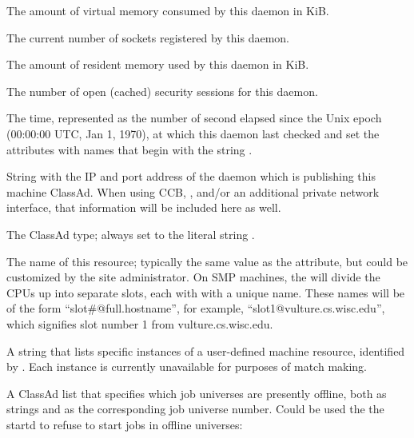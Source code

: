 \begin{description}
\item[\AdAttr{MonitorSelfImageSize}:] The amount of virtual memory consumed by
  this daemon in KiB.

\item[\AdAttr{MonitorSelfRegisteredSocketCount}:] The current number of sockets
  registered by this daemon.

\item[\AdAttr{MonitorSelfResidentSetSize}:] The amount of resident memory
  used by this daemon in KiB.

\item[\AdAttr{MonitorSelfSecuritySessions}:] The number of open (cached)
  security sessions for this daemon.

\item[\AdAttr{MonitorSelfTime}:] The  time, represented as the number of
  second elapsed since the Unix epoch (00:00:00 UTC, Jan 1, 1970),
  at which this daemon last checked and set the attributes with names that
  begin with the string .
  
\item[\AdAttr{MyAddress}:] String with the IP and port address of the
 daemon which is publishing this machine ClassAd.
When using CCB, , and/or an additional private
network interface, that information will be included here as well.

\item[\AdAttr{MyType}:] The ClassAd type; always set to the literal string .
%
\item[\AdAttr{Name}:] The name of this resource; typically the same value as
the  attribute, but could be customized by the site
administrator.
On SMP machines, the  will divide the CPUs up into separate
slots, each with with a unique name.
These names will be of the form ``slot\#@full.hostname'', for example,
``slot1@vulture.cs.wisc.edu'', which signifies slot number 1 from
vulture.cs.wisc.edu.
%
\label{OfflineName-machine-attribute}
\item[\AdAttr{Offline<name>}:] A string that lists specific
instances of a user-defined machine resource,
identified by . 
Each instance is currently unavailable for purposes of match making.
%
\label{OfflineUnverses-machine-attribute}
\item[\AdAttr{OfflineUniverses}:] A ClassAd list that specifies which
job universes are presently offline, both as strings and as the corresponding
job universe number.  Could be used the the startd to refuse to start jobs
in offline universes:


\end{description}
